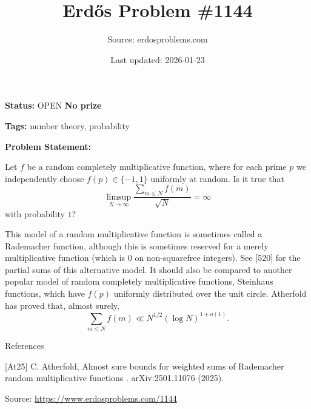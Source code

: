 \documentclass{article}
\title{Erd\H{o}s Problem \#1144}
\date{Last updated: 2026-01-23}
\author{Source: erdosproblems.com}
\begin{document}
\maketitle

\noindent\textbf{Status:} OPEN \quad \textbf{No prize}

\noindent\textbf{Tags:} number theory, probability

\medskip

\noindent\textbf{Problem Statement:}

Let $f$ be a random completely multiplicative function, where for each prime $p$ we independently choose $f(p)\in \{-1,1\}$ uniformly at random. Is it true that\[\limsup_{N\to \infty}\frac{\sum_{m\leq N}f(m)}{\sqrt{N}}=\infty\]with probability $1$?




This model of a random multiplicative function is sometimes called a Rademacher function, although this is sometimes reserved for a merely multiplicative function (which is $0$ on non-squarefree integers). See [520] for the partial sums of this alternative model. It should also be compared to another popular model of random completely multiplicative functions, Steinhaus functions, which have $f(p)$ uniformly distributed over the unit circle. Atherfold \cite{At25} has proved that, almost surely,\[\sum_{m\leq N}f(m)\ll N^{1/2}(\log N)^{1+o(1)}.\]




References

[At25] C. Atherfold, Almost sure bounds for weighted sums of Rademacher random multiplicative functions . arXiv:2501.11076 (2025).


\bigskip
\noindent\small{Source: \url{https://www.erdosproblems.com/1144}}
\end{document}
